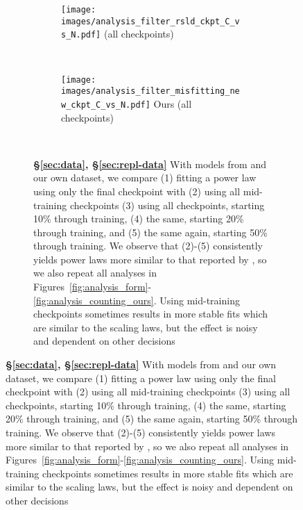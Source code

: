 \begin{figure}[]
\ContinuedFloat
\centering 
\begin{subfigure}{\textwidth}
\centering
\begin{subfigure}{0.49\textwidth}
    \centering
    \texttt{[image: images/analysis\_filter\_rsld\_ckpt\_C\_vs\_N.pdf]}
    \footnotesize{\citet{porian2024resolving} (all checkpoints)}
\end{subfigure}
\\ \vspace{1em}
\begin{subfigure}{0.49\textwidth}
    \centering
    \texttt{[image: images/analysis\_filter\_misfitting\_new\_ckpt\_C\_vs\_N.pdf]}
    \footnotesize{Ours (all checkpoints)}
\end{subfigure}
\\ \vspace{1em}
\caption{\textbf{\S\ref{sec:data}, \S\ref{sec:repl-data}} With models from \citet{porian2024resolving} and our own dataset, we compare (1) fitting a power law using only the final checkpoint with (2) using all mid-training checkpoints (3) using all checkpoints, starting 10\% through training, (4) the same, starting 20\% through training, and (5) the same again, starting 50\% through training. We observe that (2)-(5) consistently
yields power laws more similar to that reported by \citet{hoffmann2022training}, so we also repeat all analyses in Figures~\ref{fig:analysis_form}-\ref{fig:analysis_counting_ours}. Using mid-training checkpoints sometimes results in more stable fits which are similar to the \citet{hoffmann2022training} scaling laws, but the effect is noisy and dependent on other decisions
}
\label{fig:analysis_checkpoint_app}        
\end{subfigure}
\end{figure}


